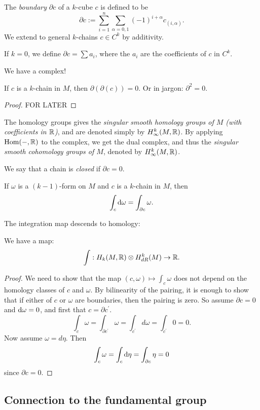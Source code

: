 \documentclass[11pt, english]{article}
\begin{document}
\begin{defi}
  The \emph{boundary} $\partial c$ of a $k$-cube $c$ is defined to be 
\[
\partial c  := \sum_{i=1}^n \sum_{\alpha = 0,1} (-1)^{i+\alpha} c_{(i,\alpha)}.
\]
We extend to general $k$-chains $c \in C^k$ by additivity.

If $k=0$, we define $\partial c = \sum a_i$, where the $a_i$ are the coefficients of $c$ in $C^k$.
\end{defi}

We have a complex!

\begin{prop}
 If $c$ is a $k$-chain in $M$, then $\partial(\partial (c)) = 0$. Or in jargon: $\partial^2=0$.
\end{prop}
\begin{proof}
FOR LATER
\end{proof}

The homology groups gives the \emph{singular smooth  homology groups of $M$ (with coefficients in $\mathbb{R}$)}, and are denoted simply by $H_{\infty}^k(M,\mathbb{R})$. By applying $\operatorname{Hom}(-,\mathbb{R})$ to the complex, we get the dual complex, and thus the \emph{singular smooth cohomology groups of $M$}, denoted by $H_{\infty}^k(M,\mathbb{R})$.

We say that a chain is \emph{closed} if $\partial c =0$.

\begin{thm}
  If $\omega$ is a $(k-1)$-form on $M$ and $c$ is a $k$-chain in $M$, then
\[
\int_c \mathrm{d}{\omega} = \int_{\partial c} \omega.
\]
\end{thm}

The integration map descends to homology:
\begin{prop}
We have a map:
\[
\int: H_k(M,\mathbb{R}) \otimes H_{dR}^k(M) \to \mathbb{R}.
\]
\end{prop}
\begin{proof}
We need to show that the map $(c,\omega) \mapsto \int_c \omega$ does not depend on the homology classes of $c$ and $\omega$. By bilinearity of the pairing, it is enough to show that if either of $c$ or $\omega$ are boundaries, then the pairing is zero. So assume $\partial c =0$ and $\mathrm{d}{\omega} = 0$, and first that $c = \partial c^\prime$.
\[
\int_c \omega = \int_{\partial c^\prime} \omega = \int_{c^\prime} d \omega = \int_{c ^\prime} 0 = 0.
\]
Now assume $\omega = d \eta$. Then
\[
\int_c \omega = \int_c \mathrm{d}{\eta} = \int_{\partial c} \eta = 0
\]
since $\partial c = 0$. 
\end{proof}

\subsection{Connection to the fundamental group}
\end{document}

